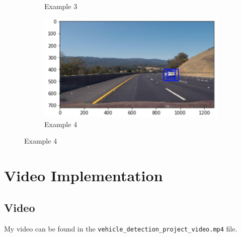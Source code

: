 \documentclass[12pt]{article}
\begin{document}
\begin{figure}[!h]
\begin{subfigure}{0.495\textwidth}
\caption{Example 3}
\end{subfigure}
\begin{subfigure}{0.495\textwidth}
\centering
\includegraphics[scale=0.6]{example4.png}
\caption{Example 4}
\end{subfigure}
\end{figure}

\section{Video Implementation}
\subsection{Video}
My video can be found in the \texttt{vehicle\_detection\_project\_video.mp4} file. 
\end{document}
